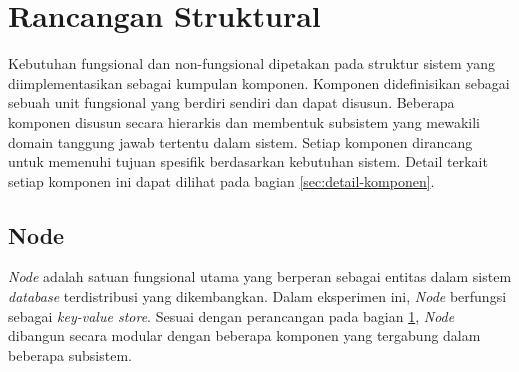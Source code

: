 \section{Rancangan Struktural}
\label{sec:rancangan-struktural}

Kebutuhan fungsional dan non-fungsional dipetakan pada struktur sistem yang diimplementasikan sebagai kumpulan komponen. Komponen didefinisikan sebagai sebuah unit fungsional yang berdiri sendiri dan dapat disusun. Beberapa komponen disusun secara hierarkis dan membentuk subsistem yang mewakili domain tanggung jawab tertentu dalam sistem. Setiap komponen dirancang untuk memenuhi tujuan spesifik berdasarkan kebutuhan sistem. Detail terkait setiap komponen ini dapat dilihat pada bagian \ref{sec:detail-komponen}.

\subsection{Node}
\label{subsection:node}

\textit{Node} adalah satuan fungsional utama yang berperan sebagai entitas dalam sistem \textit{database} terdistribusi yang dikembangkan. Dalam eksperimen ini, \textit{Node} berfungsi sebagai \textit{key-value store}. Sesuai dengan perancangan pada bagian \ref{sec:rancangan-struktural}, \textit{Node} dibangun secara modular dengan beberapa komponen yang tergabung dalam beberapa subsistem.



